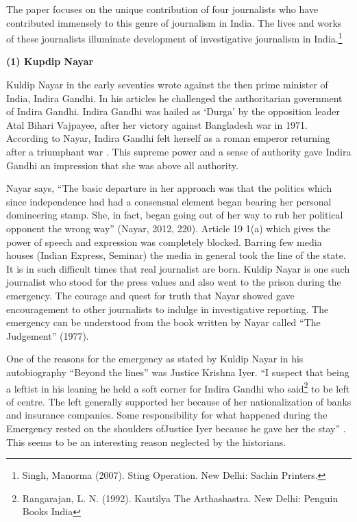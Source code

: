 \begin{multicols}{2}
\vspace{-.1cm}

\noi
The paper focuses on the unique contribution of four journalists who have contributed
immensely to this genre of journalism in India. The lives and works of these journalists
illuminate development of investigative journalism in India.\footnote{Singh, Manorma (2007). Sting Operation. New Delhi: Sachin Printers.}

\vspace{-.1cm}

\noi
{\large \bfseries (1) Kupdip Nayar}

\vspace{-.1cm}

\noi
Kuldip Nayar in the early seventies wrote against the then prime minister of India, Indira
Gandhi. In his articles he challenged the authoritarian government of Indira Gandhi. Indira
Gandhi was hailed as ‘Durga’ by the opposition leader Atal Bihari Vajpayee, after her victory
against Bangladesh war in 1971. According to Nayar, Indira Gandhi felt herself as a roman
emperor returning after a triumphant war . This supreme power and a sense of authority gave
Indira Gandhi an impression that she was above all authority.

\noi
Nayar says, “The basic departure in her approach was that the politics which since
independence had had a consensual element began bearing her personal domineering stamp.
She, in fact, began going out of her way to rub her political opponent the wrong way” (Nayar,
2012, 220). Article 19 1(a) which gives the power of speech and expression was completely
blocked. Barring few media houses (Indian Express, Seminar) the media in general took the
line of the state. It is in such difficult times that real journalist are born. Kuldip Nayar is one
such journalist who stood for the press values and also went to the prison during the emergency.
The courage and quest for truth that Nayar showed gave encouragement to other journalists to
indulge in investigative reporting. The emergency can be understood from the book written by
Nayar called “The Judgement” (1977).

\noi
One of the reasons for the emergency as stated by Kuldip Nayar in his autobiography “Beyond
the lines” was Justice Krishna Iyer. “I suspect that being a leftist in his leaning he held a soft
corner for Indira Gandhi who said\footnote{Rangarajan, L. N. (1992). Kautilya The Arthashastra. New Delhi: Penguin Books India} to be left of centre. The left generally supported her because of her nationalization of banks and insurance companies. Some responsibility for what happened during the Emergency rested on the shoulders ofJustice Iyer because he gave her the stay” . This seems to be an interesting reason neglected by the historians.


\end{multicols}
